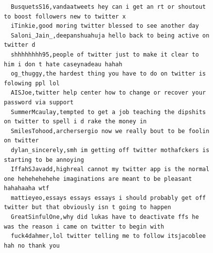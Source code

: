\begin{figure}[htpb]
\begin{verbatim}
  BusquetsS16,vandaatweets hey can i get an rt or shoutout to boost followers new to twitter x
  iTinkie,good moring twitter blessed to see another day
  Saloni_Jain_,deepanshuahuja hello back to being active on twitter d
  shhhhhhhh95,people of twitter just to make it clear to him i don t hate caseynadeau hahah
  og_thuggy,the hardest thing you have to do on twitter is folowing ppl lol
  AISJoe,twitter help center how to change or recover your password via support
  SummerMcaulay,tempted to get a job teaching the dipshits on twitter to spell i d rake the money in
  SmilesTohood,archersergio now we really bout to be foolin on twitter
  dylan_sincerely,smh im getting off twitter mothafckers is starting to be annoying
  IffahSJavadd,highreal cannot my twitter app is the normal one hehehehehehe imaginations are meant to be pleasant hahahaaha wtf
  mattieyeo,essays essays essays i should probably get off twitter but that obviously isn t going to happen
  GreatSinfulOne,why did lukas have to deactivate ffs he was the reason i came on twitter to begin with
  fuck4dahmer,lol twitter telling me to follow itsjacoblee hah no thank you


\end{verbatim}
\end{figure}
